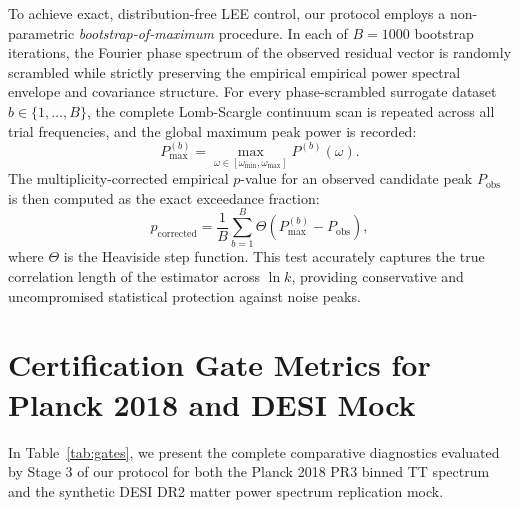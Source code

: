 \documentclass[10pt,twocolumn,a4paper]{article}
\begin{document}
To achieve exact, distribution-free LEE control, our protocol employs a non-parametric \textit{bootstrap-of-maximum} procedure. In each of $B = 1000$ bootstrap iterations, the Fourier phase spectrum of the observed residual vector is randomly scrambled while strictly preserving the empirical empirical power spectral envelope and covariance structure. For every phase-scrambled surrogate dataset $b \in \{1, \dots, B\}$, the complete Lomb-Scargle continuum scan is repeated across all trial frequencies, and the global maximum peak power is recorded:
\begin{equation}
P_{\max}^{(b)} = \max_{\omega \in [\omega_{\min}, \omega_{\max}]} P^{(b)}(\omega).
\end{equation}
The multiplicity-corrected empirical $p$-value for an observed candidate peak $P_{\mathrm{obs}}$ is then computed as the exact exceedance fraction:
\begin{equation}
p_{\mathrm{corrected}} = \frac{1}{B} \sum_{b=1}^{B} \Theta\left( P_{\max}^{(b)} - P_{\mathrm{obs}} \right),
\end{equation}
where $\Theta$ is the Heaviside step function. This test accurately captures the true correlation length of the estimator across $\ln k$, providing conservative and uncompromised statistical protection against noise peaks.

\section{Certification Gate Metrics for Planck 2018 and DESI Mock}
In Table~\ref{tab:gates}, we present the complete comparative diagnostics evaluated by Stage 3 of our protocol for both the Planck 2018 PR3 binned TT spectrum and the synthetic DESI DR2 matter power spectrum replication mock. 
\end{document}
